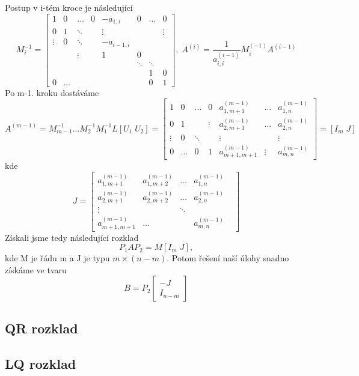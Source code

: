 \documentclass{article}
\theoremstyle{plain}
\theoremstyle{definition}
\begin{document}
Postup v i-tém kroce je následující
\[
M_i^{-1} = \begin{bmatrix}
    1 & 0 & \hdots & 0 & -a_{1,i}&0 &\hdots & 0 \\
    0 & 1 & \ddots & & \vdots & & & \vdots   \\
    \vdots & 0 & \ddots & & -a_{i-1,i} & & \\
    & & \vdots & & 1 & 0 & \\
    & & & & & \ddots & \ddots& \\
    & & & & & & 1 & 0 \\
    0& \hdots & & & & & 0 & 1
\end{bmatrix}, \; A^{(i)} = \frac{1}{a_{i,i}^{(i-1)}}M_i^{(-1)}A^{(i-1)}
\]
Po m-1. kroku dostáváme
\[ A^{(m-1)} = M_{m-1}^{-1} \hdots M_2^{-1}M_1^{-1}L[U_1\; U_2] = \begin{bmatrix}
    1 & 0 & \hdots & 0 & a_{1,m+1}^{(m-1)} & \hdots & a_{1,n}^{(m-1)} \\
    0 & 1 & & \vdots & a_{2,m+1}^{(m-1)} & \hdots & a_{2,n}^{(m-1)} \\
    \vdots & 0 & \ddots & & \vdots & & \vdots \\
    0 & \hdots & 0 & 1 & a_{m+1,m+1}^{(m-1)} & \vdots & a_{m,n}^{(m-1)}
\end{bmatrix}
= [I_m \; J]
\]
kde
\[J=\begin{bmatrix}
    a_{1,m+1}^{(m-1)} & a_{1,m+2}^{(m-1)} & \hdots & a_{1,n}^{(m-1)} \\
    a_{2,m+1}^{(m-1)} & a_{2,m+2}^{(m-1)} & \hdots & a_{2,n}^{(m-1)} \\
    \vdots & &\ddots & & \\
    a_{m+1,m+1}^{(m-1)}& \hdots & & a_{m,n}^{(m-1)}
\end{bmatrix}
\]
Získali jsme tedy následující rozklad 
\[ P_1 A P_2 = M [I_m \; J]
,\]
kde M je řádu m a J je typu $m \times (n-m)$. Potom řešení naší úlohy snadno získáme ve tvaru
\[ B = P_2 \begin{bmatrix}
    -J\\
    I_{n-m}
\end{bmatrix}
\]

\newpage

\subsection{QR rozklad}
\subsection{LQ rozklad}
\end{document}
